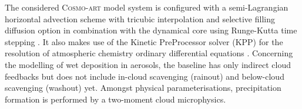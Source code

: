 The considered  \textsc{Cosmo-art} model  system is configured  with a
semi-Lagrangian    horizontal   advection    sche\-me    with   tricubic
interpolation  and selective filling  diffusion option  in combination
with   the   dynamical    core   using   Runge-Kutta   time   stepping
\citep{COSMO-PartI-2011}.    It  also   makes  use   of   the  Kinetic
PreProcessor solver (KPP) for  the resolution of atmospheric chemistry
ordinary  differential equations \citep{Damian-2002}.   Concerning the
modelling  of  wet  deposition  in  aerosols, the  baseline  has  only
indirect  cloud feedbacks  but  does not  include in-cloud  scavenging
(rainout) and below-cloud  scavenging (washout) yet.  Amongst physical
parameterisations,   precipitation  formation   is   performed  by   a
two-moment cloud microphysics.
